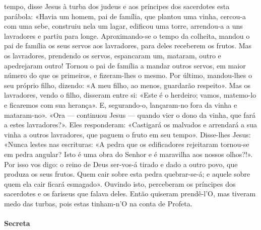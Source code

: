 \begin{paracol}{2}
{ tempo, disse Jesus à turba dos judeus e aos príncipes dos sacerdotes esta parábola: «Havia um homem, pai de família, que plantou uma vinha, cercou-a com uma sebe, construiu nela um lagar, edificou uma torre, arrendou-a a uns lavradores e partiu para longe. Aproximando-se o tempo da colheita, mandou o pai de família os seus servos aos lavradores, para deles receberem os frutos. Mas os lavradores, prendendo os servos, espancaram um, mataram, outro e apedrejaram outro! Tornou o pai de família a mandar outros servos, em maior número do que os primeiros, e fizeram-lhes o mesmo. Por último, mandou-lhes o seu próprio filho, dizendo: «A meu filho, ao menos, guardarão respeito». Mas os lavradores, vendo o filho, disseram entre si: «Este é o herdeiro; vamos, matemo-lo e ficaremos com sua herança». E, segurando-o, lançaram-no fora da vinha e mataram-no». «Ora — continuou Jesus — quando vier o dono da vinha, que fará a estes lavradores?». Eles responderam: «Castigará os malvados e arrendará a sua vinha a outros lavradores, que paguem o fruto em seu tempo». Disse-lhes Jesus: «Nunca lestes nas escrituras: «A pedra que os edificadores rejeitaram tornou-se em pedra angular? Isto é uma obra do Senhor e é maravilha aos nossos olhos?!». Por isso vos digo: o reino de Deus ser-vos-á tirado e dado a outro povo, que produza os seus frutos. Quem cair sobre esta pedra quebrar-se-á; e aquele sobre quem ela cair ficará esmagado». Ouvindo isto, perceberam os príncipes dos sacerdotes e os fariseus que falava deles. Então quiseram prendê-l’O, mas tiveram medo das turbas, pois estas tinham-n’O na conta de Profeta.
}\end{paracol}

\begin{paracol}{2}\switchcolumn{}\end{paracol}

\paragraph{Secreta}
\begin{paracol}{2}\switchcolumn{}\end{paracol}

